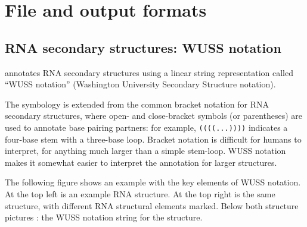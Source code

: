\section{File and output formats}

\subsection{RNA secondary structures: WUSS notation}

 annotates RNA secondary structures using a linear
string representation called ``WUSS notation'' (Washington University
Secondary Structure notation).

The symbology is extended from the common bracket notation for RNA
secondary structures, where open- and close-bracket symbols (or
parentheses) are used to annotate base pairing partners: for example,
\verb+((((...))))+ indicates a four-base stem with a three-base loop.
Bracket notation is difficult for humans to interpret, for anything
much larger than a simple stem-loop. WUSS notation makes it somewhat
easier to interpret the annotation for larger structures.

The following figure shows an example with the key elements of WUSS
notation.  At the top left is an example RNA structure. At the top
right is the same structure, with different RNA structural elements
marked. Below both structure pictures : the WUSS notation string for
the structure.

